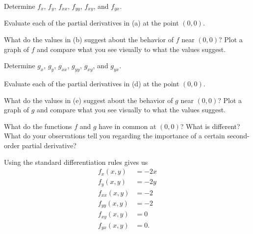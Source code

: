 \begin{exercises}
    \ba
   	\item Determine $f_x$, $f_y$, $f_{xx}$, $f_{yy}$, $f_{xy}$, and $f_{yx}$.
	\item Evaluate each of the partial derivatives in (a) at the point $(0,0)$.
	\item What do the values in (b) suggest about the behavior of $f$ near $(0,0)$?  Plot a graph of $f$ and compare what you see visually to what the values suggest.
	\item Determine $g_x$, $g_y$, $g_{xx}$, $g_{yy}$, $g_{xy}$, and $g_{yx}$.
	\item Evaluate each of the partial derivatives in (d) at the point $(0,0)$.
	\item What do the values in (e) suggest about the behavior of $g$ near $(0,0)$?  Plot a graph of $g$ and compare what you see visually to what the values suggest.
	\item What do the functions $f$ and $g$ have in common at $(0,0)$?  What is different?  What do your observations tell you regarding the importance of a certain second-order partial derivative?
	 
    \ea


\begin{exerciseSolution}
    \ba
   	\item Using the standard differentiation rules gives us
\begin{align*}
f_x(x,y) &= -2x \\
f_y(x,y) &= -2y \\
f_{xx}(x,y) &= -2 \\
f_{yy}(x,y) &= -2 \\
f_{xy}(x,y) &= 0 \\
f_{yx}(x,y) &= 0.
\end{align*}


\end{exerciseSolution}
\end{exercises}
